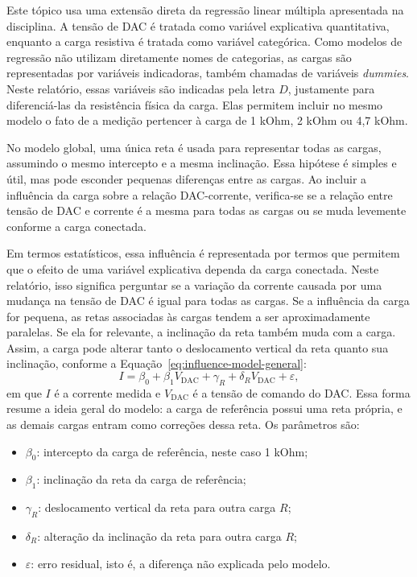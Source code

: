 \documentclass[
  brazilian,
]{article}
\providecommand{\tightlist}{%
  \setlength{\itemsep}{0pt}\setlength{\parskip}{0pt}}
\renewcommand{\_}{\oldunderscore\discretionary{}{}{}}
\begin{document}
Este tópico usa uma extensão direta da regressão linear múltipla
apresentada na disciplina. A tensão de DAC é tratada como variável
explicativa quantitativa, enquanto a carga resistiva é tratada como
variável categórica. Como modelos de regressão não utilizam diretamente
nomes de categorias, as cargas são representadas por variáveis
indicadoras, também chamadas de variáveis \emph{dummies}. Neste relatório,
essas variáveis são indicadas pela letra \(D\), justamente para
diferenciá-las da resistência física da carga. Elas permitem incluir no
mesmo modelo o fato de a medição pertencer à carga de 1 kOhm, 2 kOhm ou
4,7 kOhm.

No modelo global, uma única reta é usada para representar todas
as cargas, assumindo o mesmo intercepto e a mesma inclinação. Essa
hipótese é simples e útil, mas pode esconder pequenas diferenças entre as
cargas. Ao incluir a influência da carga sobre a relação DAC-corrente,
verifica-se se a relação entre tensão de DAC e corrente é a mesma para
todas as cargas ou se muda levemente conforme a carga conectada.

Em termos estatísticos, essa influência é representada por termos que
permitem que o efeito de uma variável explicativa dependa da carga
conectada. Neste relatório, isso significa perguntar se a variação da
corrente causada por uma mudança na tensão de DAC é igual para todas as
cargas. Se a influência da carga for pequena, as retas associadas às
cargas tendem a ser aproximadamente paralelas. Se ela for relevante, a
inclinação da reta também muda com a carga. Assim, a carga pode alterar
tanto o deslocamento vertical da reta quanto sua inclinação, conforme a
Equação~\ref{eq:influence-model-general}:
\begin{equation}
I = \beta_0 + \beta_1 V_{\mathrm{DAC}} + \gamma_R +
\delta_R V_{\mathrm{DAC}} + \varepsilon,
\label{eq:influence-model-general}
\end{equation}
em que \(I\) é a corrente medida e \(V_{\mathrm{DAC}}\) é a tensão de
comando do DAC. Essa forma resume a ideia geral do modelo: a carga de
referência possui uma reta própria, e as demais cargas entram como
correções dessa reta. Os parâmetros são:

\begin{itemize}
\tightlist
\item
  \(\beta_0\): intercepto da carga de referência, neste caso 1 kOhm;
\item
  \(\beta_1\): inclinação da reta da carga de referência;
\item
  \(\gamma_R\): deslocamento vertical da reta para outra carga \(R\);
\item
  \(\delta_R\): alteração da inclinação da reta para outra carga \(R\);
\item
  \(\varepsilon\): erro residual, isto é, a diferença não explicada pelo
  modelo.
\end{itemize}
\end{document}
